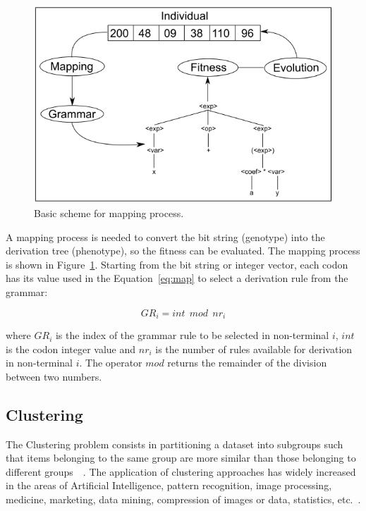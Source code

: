 \documentclass[conference,compsoc]{IEEEtran}
\begin{document}
\begin{figure}[!htb]
	\centering
	\includegraphics[scale=.4]{figures/ge_algo.png}
	\caption{Basic scheme for mapping process.~\cite{cerri2013grammatical}}
	\label{fig:ge_algo}
\end{figure}

A mapping process is needed to convert the bit string (genotype) into the derivation tree (phenotype), so the fitness can be evaluated. The mapping process is shown in Figure~\ref{fig:ge_algo}. Starting from the bit string or integer vector, each codon has its value used in the Equation~\ref{eq:map} to select a derivation rule from the grammar:

\begin{equation}\label{eq:map}
GR_i = int~~mod~~nr_i
\end{equation}

where $GR_i$ is the index of the grammar rule to be selected in non-terminal $i$, $int$ is the codon integer value and $nr_i$ is the number of rules available for derivation in non-terminal $i$. The operator $mod$ returns the remainder of the division between two numbers.


\subsection{Clustering}

The Clustering problem consists in partitioning a dataset into subgroups such that items belonging to the same group are more similar than those belonging to different groups~\cite{boric2007genetic}~\cite{ahalya2015data}. The application of clustering approaches has widely increased in the areas of Artificial Intelligence, pattern recognition, image processing, medicine, marketing, data mining, compression of images or data, statistics, etc.~\cite{ahalya2015data}.
\end{document}
